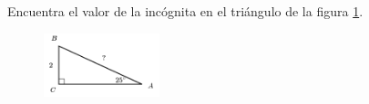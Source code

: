 \question[15]  Encuentra el valor de la incógnita en el triángulo de la figura \ref{fig:lados_functrig_10}.
\begin{figure}[H]
    \begin{center}
        \includegraphics[width=0.3\textwidth]{../images/lados_functrig_10.png}
    \end{center}
    \caption{}
    \label{fig:lados_functrig_10}
\end{figure}